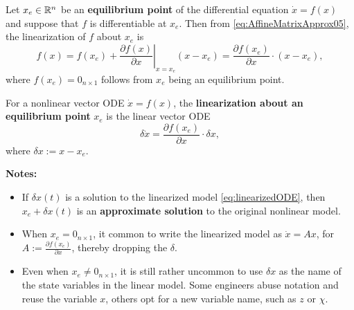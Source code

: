   \bigskip
\begin{tcolorbox}[colback=mylightblue, title = {\bf Linearization About an Equilibrium Point}, breakable]

Let $x_e \in \mathbb R^n$ be an \textbf{equilibrium point} of the differential equation $\dot{x} = f(x)$ and suppose that $f$ is differentiable at $x_e$. Then from \eqref{eq:AffineMatrixApprox05}, the linearization of $f$ about $x_e$ is
$$ f(x) = f(x_e) + \left. \frac{\partial f(x)}{\partial x}\right|_{x = x_e} (x-x_e) = \frac{\partial f(x_e)}{\partial x}\cdot (x-x_e),$$
where $f(x_e) = 0_{n \times 1}$ follows from $x_e$ being an equilibrium point.\\

  \begin{definition} 
   \label{def:linearizedODE}
   For a nonlinear vector ODE $\dot{x} = f(x)$, the \textbf{linearization about an equilibrium point} $x_e$ is the linear vector ODE
\begin{equation}
 \label{eq:linearizedODE}
\delta  \dot{x} =   \frac{\partial f(x_e)}{\partial x}\cdot \delta x,  
\end{equation}
where $\delta x:= x - x_e$.
\end{definition}
 \vspace*{.1cm}
\textbf{Notes:} 
\begin{itemize}
    \item If $\delta x(t)$ is a solution to the linearized model \eqref{eq:linearizedODE}, then $x_e + \delta x(t)$ is an \textbf{approximate solution} to the original nonlinear model.
    \item When $x_e=0_{n \times 1}$, it common to write the linearized model as $\dot{x} = A x$, for $A:=\frac{\partial f(x_e)}{\partial x}$, thereby dropping the $\delta$.
    \item Even when $x_e \neq 0_{n \times 1}$, it is still rather uncommon to use $\delta x$ as the name of the state variables in the linear model. Some engineers abuse notation and reuse the variable $x$, others opt for a new variable name, such as $z$ or $\chi$. 
\end{itemize}
\end{tcolorbox}

 \bigskip

